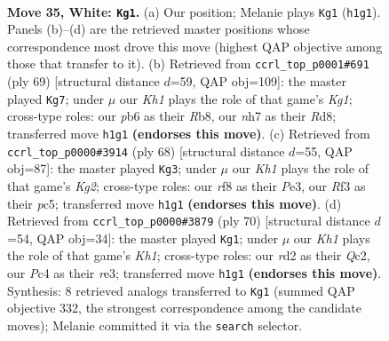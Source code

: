 \documentclass[11pt]{article}
\begin{document}
\clearpage

\begin{figure}[p]\centering
\begin{subfigure}{0.46\textwidth}\centering
\resizebox{\linewidth}{!}{%
\newchessgame
\chessboard[
  setfen={5rk1/7n/1pq5/p1p4Q/2P2p2/1P3R2/P2r3B/1R5K w - - 0 35},
  showmover=false,
  pgfstyle=straightmove, color=movearrow, markmove={h1-g1}
]}
\caption{}
\end{subfigure}\hfill
\begin{subfigure}{0.46\textwidth}\centering
\resizebox{\linewidth}{!}{%
\newchessgame
\chessboard[
  setfen={1r1r2k1/5p2/4p1pp/Q3P3/2qb3P/R5P1/3R1PBK/8 b - - 1 35},
  showmover=false,
  pgfstyle=straightmove, color=movearrow, markmove={g8-g7}
]}
\caption{}
\end{subfigure}
\\[4pt]
\begin{subfigure}{0.46\textwidth}\centering
\resizebox{\linewidth}{!}{%
\newchessgame
\chessboard[
  setfen={2r4k/1q3r1p/3B2pP/p1p5/2Q1R2P/4P3/P4PK1/8 w - - 1 35},
  showmover=false,
  pgfstyle=straightmove, color=movearrow, markmove={g2-g3}
]}
\caption{}
\end{subfigure}\hfill
\begin{subfigure}{0.46\textwidth}\centering
\resizebox{\linewidth}{!}{%
\newchessgame
\chessboard[
  setfen={r5k1/P4p1p/R5p1/3q4/2p5/4r2P/1PQ3P1/R6K w - - 0 36},
  showmover=false,
  pgfstyle=straightmove, color=movearrow, markmove={h1-g1}
]}
\caption{}
\end{subfigure}
\caption{\textbf{Move 35, White: \texttt{Kg1}.} (a) Our position; Melanie plays \texttt{Kg1} (\texttt{h1g1}). Panels (b)--(d) are the retrieved master positions whose correspondence most drove this move (highest QAP objective among those that transfer to it). (b) Retrieved from \texttt{ccrl\_top\_p0001\#691} (ply 69) [structural distance $d$=59, QAP obj=109]: the master played \texttt{Kg7}; under $\mu$ our \emph{Kh1} plays the role of that game's \emph{Kg1}; cross-type roles: our \emph{p}b6 as their \emph{R}b8, our \emph{n}h7 as their \emph{R}d8; transferred move \texttt{h1g1} \textbf{(endorses this move)}. (c) Retrieved from \texttt{ccrl\_top\_p0000\#3914} (ply 68) [structural distance $d$=55, QAP obj=87]: the master played \texttt{Kg3}; under $\mu$ our \emph{Kh1} plays the role of that game's \emph{Kg2}; cross-type roles: our \emph{r}f8 as their \emph{P}e3, our \emph{R}f3 as their \emph{p}c5; transferred move \texttt{h1g1} \textbf{(endorses this move)}. (d) Retrieved from \texttt{ccrl\_top\_p0000\#3879} (ply 70) [structural distance $d$=54, QAP obj=34]: the master played \texttt{Kg1}; under $\mu$ our \emph{Kh1} plays the role of that game's \emph{Kh1}; cross-type roles: our \emph{r}d2 as their \emph{Q}c2, our \emph{P}c4 as their \emph{r}e3; transferred move \texttt{h1g1} \textbf{(endorses this move)}. Synthesis: 8 retrieved analogs transferred to \texttt{Kg1} (summed QAP objective 332, the strongest correspondence among the candidate moves); Melanie committed it via the \texttt{search} selector.}
\label{fig:thought-m68}
\end{figure}
\end{document}
